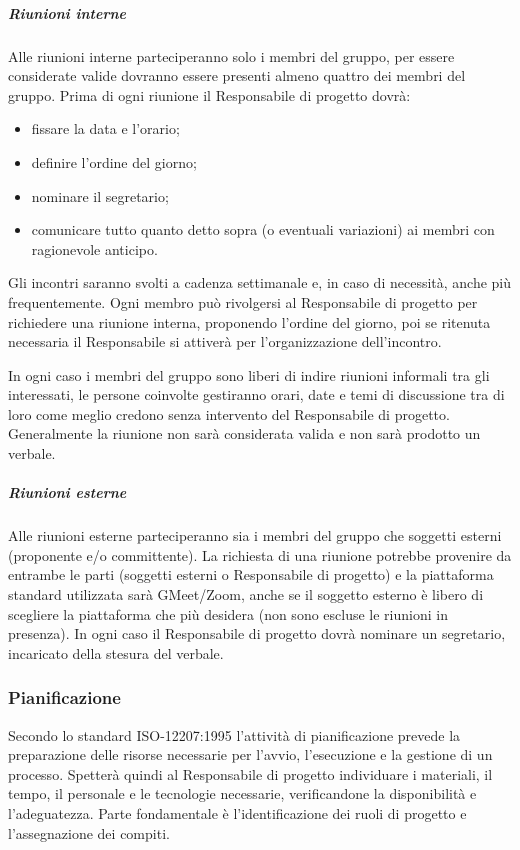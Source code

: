 \subparagraph{Riunioni interne}
Alle riunioni interne parteciperanno solo i membri del gruppo, per essere considerate valide dovranno essere presenti almeno quattro dei membri del gruppo. Prima di ogni riunione il Responsabile di progetto dovrà:
\begin{itemize}
\item fissare la data e l'orario;
\item definire l'ordine del giorno;
\item nominare il segretario;
\item comunicare tutto quanto detto sopra (o eventuali variazioni) ai membri con ragionevole anticipo.
\end{itemize}

Gli incontri saranno svolti a cadenza settimanale e, in caso di necessità, anche più frequentemente.
Ogni membro può rivolgersi al Responsabile di progetto per richiedere una riunione interna, proponendo l'ordine del giorno, poi se ritenuta necessaria il Responsabile si attiverà per l'organizzazione dell'incontro.

In ogni caso i membri del gruppo sono liberi di indire riunioni informali tra gli interessati, le persone coinvolte gestiranno orari, date e temi di discussione tra di loro come meglio credono senza intervento del Responsabile di progetto.
Generalmente la riunione non sarà considerata valida e non sarà prodotto un verbale.

\subparagraph{Riunioni esterne}
Alle riunioni esterne parteciperanno sia i membri del gruppo che soggetti esterni (proponente e/o committente). La richiesta di una riunione potrebbe provenire da entrambe le parti (soggetti esterni o Responsabile di progetto) e la piattaforma standard utilizzata sarà GMeet/Zoom, anche se il soggetto esterno è libero di scegliere la piattaforma che più desidera (non sono escluse le riunioni in presenza). In ogni caso il Responsabile di progetto dovrà nominare un segretario, incaricato della stesura del verbale.


\subsubsection{Pianificazione}
Secondo lo standard ISO-12207:1995 l'attività di pianificazione prevede la preparazione delle risorse necessarie per l'avvio, l'esecuzione e la gestione di un processo. Spetterà quindi al Responsabile di progetto individuare i materiali, il tempo, il personale e le tecnologie necessarie, verificandone la disponibilità e l'adeguatezza. Parte fondamentale è l'identificazione dei ruoli di progetto e l'assegnazione dei compiti.

